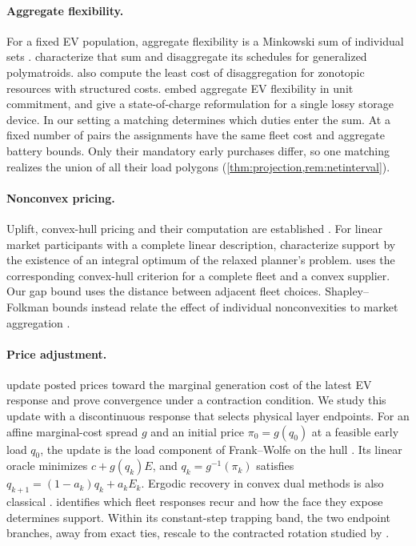 \documentclass[11pt]{article}
\theoremstyle{definition}\newtheorem{definition}[theorem]{Definition}
\theoremstyle{remark}\newtheorem{remark}[theorem]{Remark}
\begin{document}
\paragraph{Aggregate flexibility.}
For a fixed EV population, aggregate flexibility is a Minkowski sum of
individual sets \citep{mukhiAbate2023exact,altaha2024flexibility}.
\citet[Thms.~3 and~7]{mukhiLohoAbate2025exact} characterize that sum and
disaggregate its schedules for generalized polymatroids.
\citet[Eqs.~(15)--(17)]{muller2019aggregation} also compute the least cost of
disaggregation for zonotopic resources with structured costs.
\citet{arvis2026aggregated} embed aggregate EV flexibility in unit commitment,
and \citet{altahaBitar2024lossy} give a state-of-charge reformulation for a
single lossy storage device. In our setting a matching determines which duties
enter the sum. At a fixed number of pairs the assignments have the same fleet
cost and aggregate battery bounds. Only their mandatory early purchases
differ, so one matching realizes the union of all their load polygons
(\cref{thm:projection,rem:netinterval}).

\paragraph{Nonconvex pricing.}
Uplift, convex-hull pricing and their computation are established
\citep{oneill2005,gribikHoganPope2007,huaBaldick2017,schiro2016,andrianesis2022hull}.
For linear market participants with a complete linear description,
\citet[Thm.~1]{huembs2022complete} characterize support by the existence
of an integral optimum of the relaxed planner's problem. 
uses the corresponding convex-hull criterion for a complete fleet and a
convex supplier. Our gap bound uses the distance between adjacent fleet
choices. Shapley--Folkman bounds instead relate the effect of individual
nonconvexities to market aggregation \citep{starr1969,hreinsson2021}.

\paragraph{Price adjustment.}
\citet[Alg.~1, Eq.~(32), Cor.~4.1]{ma2016decentralized} update posted prices
toward the marginal generation cost of the latest EV response and prove
convergence under a contraction condition. We study this update with a
discontinuous response that selects physical layer endpoints. For an affine
marginal-cost spread $g$ and an initial price $\pi_0=g(q_0)$ at a feasible
early load $q_0$, the update is the load component of Frank--Wolfe on the hull
\citep[Alg.~1]{jaggi2013frankwolfe}. Its linear oracle minimizes
$c+g(q_k)E$, and $q_k=g^{-1}(\pi_k)$ satisfies
$q_{k+1}=(1-a_k)q_k+a_k E_k$. Ergodic recovery in convex dual methods is
also classical \citep{larsson1999ergodic,nedic2009approximate}.
 identifies which fleet responses recur and how the
face they expose determines support. Within its constant-step trapping band,
the two endpoint branches, away from exact ties, rescale to the contracted
rotation studied by \citet{laurent2018rotations}.
\end{document}
